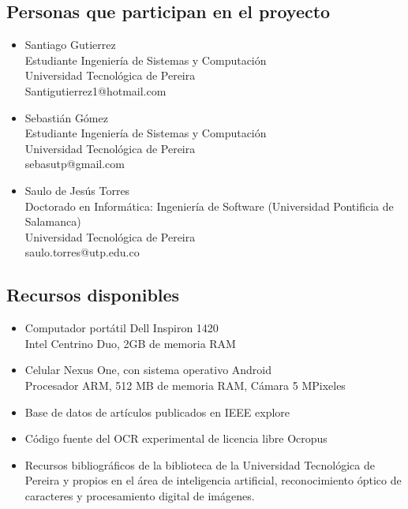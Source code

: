 \documentclass[a4paper, 11pt, oneside]{article}
\begin{document}
	\clearpage
	
	\begin{center}
	\section{Personas que participan en el proyecto}
	\end{center}
	\begin{itemize}
   \item Santiago Gutierrez\\
Estudiante Ingeniería de Sistemas y Computación\\
Universidad Tecnológica de Pereira\\
Santigutierrez1@hotmail.com
   \item Sebastián Gómez\\
Estudiante Ingeniería de Sistemas y Computación\\
Universidad Tecnológica de Pereira\\
sebasutp@gmail.com
   \item Saulo de Jesús Torres\\
Doctorado en Informática: Ingeniería de Software (Universidad Pontificia de Salamanca)\\
Universidad Tecnológica de Pereira\\
saulo.torres@utp.edu.co
	\end{itemize}
	\clearpage
	
	\begin{center}
	\section{Recursos disponibles}
	\end{center}
	\begin{itemize}
		\item Computador portátil Dell Inspiron 1420\\
			Intel Centrino Duo, 2GB de memoria RAM
		\item Celular Nexus One, con sistema operativo Android\\
			Procesador ARM, 512 MB de memoria RAM, Cámara 5 MPixeles
		\item Base de datos de artículos publicados en IEEE explore
		\item Código fuente del OCR experimental de licencia libre Ocropus
	    \item Recursos bibliográficos de la biblioteca de la Universidad Tecnológica de Pereira y propios en el área de inteligencia artificial, reconocimiento óptico de caracteres y procesamiento digital de imágenes.
	\end{itemize}
\end{document}
